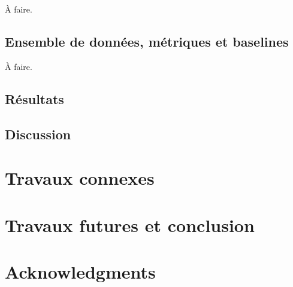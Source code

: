 \documentclass[11pt,a4paper, french]{article}
\begin{document}
À faire. 

\subsection{Ensemble de données, métriques et baselines }

À faire. 



\subsection{Résultats}


\subsection{Discussion}


\section{Travaux connexes}



\section{Travaux futures et conclusion }

\section*{Acknowledgments}
 

%
%

\appendix
\end{document}
